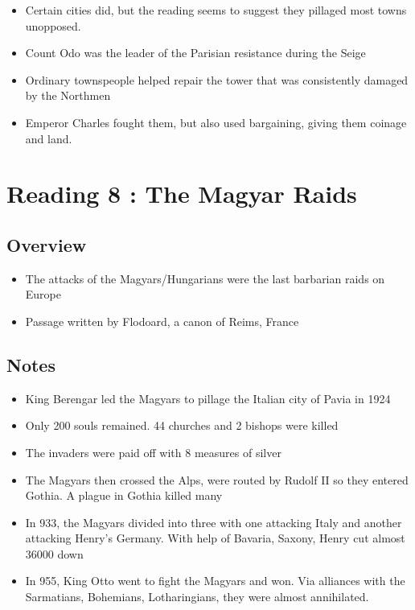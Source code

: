 \documentclass[12pt]{article}
\begin{document}
{\begin{itemize}
	\item Certain cities did, but the reading seems to suggest they pillaged most towns unopposed. 
	\item Count Odo was the leader of the Parisian resistance during the Seige
	\item Ordinary townspeople helped repair the tower that was consistently damaged by the Northmen
	\item Emperor Charles fought them, but also used bargaining, giving them coinage and land.
\end{itemize}


\section*{Reading 8 : The Magyar Raids}

\subsection*{Overview}

\begin{itemize}
	\item The attacks of the Magyars/Hungarians were the last barbarian raids on Europe
	\item Passage written by Flodoard, a canon of Reims, France
\end{itemize}

\subsection*{Notes}

\begin{itemize}
	\item King Berengar led the Magyars to pillage the Italian city of Pavia in 1924
	\item Only 200 souls remained. 44 churches and 2 bishops were killed
	\item The invaders were paid off with 8 measures of silver
	\item The Magyars then crossed the Alps, were routed by Rudolf II so they entered Gothia. A plague in Gothia killed many
	\item In 933, the Magyars divided into three with one attacking Italy and another attacking Henry's Germany. With help of Bavaria, Saxony, Henry cut almost 36000 down
	\item In 955, King Otto went to fight the Magyars and won. Via alliances with the Sarmatians, Bohemians, Lotharingians, they were almost annihilated.
\end{itemize}

}
\end{document}
